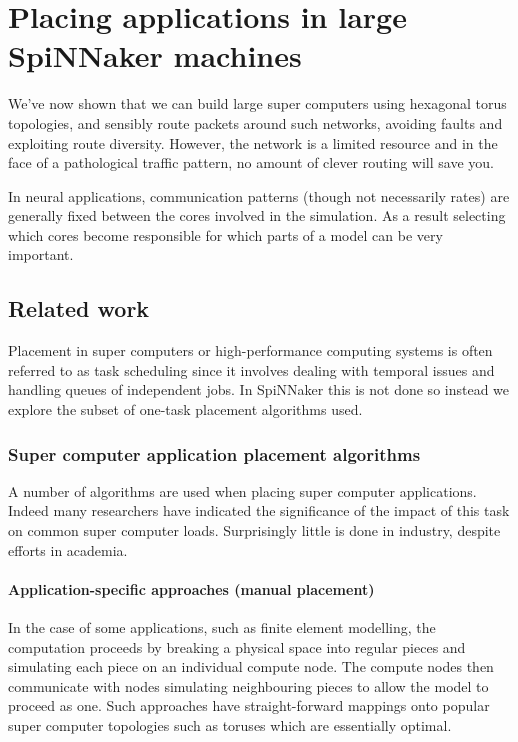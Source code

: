 \chapter{Placing applications in large SpiNNaker machines}

We've now shown that we can build large super computers using hexagonal torus
topologies, and sensibly route packets around such networks, avoiding faults
and exploiting route diversity. However, the network is a limited resource and
in the face of a pathological traffic pattern, no amount of clever routing will
save you.

In neural applications, communication patterns (though not necessarily rates)
are generally fixed between the cores involved in the simulation. As a result
selecting which cores become responsible for which parts of a model can be very
important.

	\section{Related work}
		
		Placement in super computers or high-performance computing systems is often
		referred to as task scheduling since it involves dealing with temporal
		issues and handling queues of independent jobs. In SpiNNaker this is not
		done so instead we explore the subset of one-task placement algorithms
		used.
		
		\subsection{Super computer application placement algorithms}
			
			A number of algorithms are used when placing super computer applications.
			Indeed many researchers have indicated the significance of the impact of
			this task on common super computer loads. Surprisingly little is done in
			industry, despite efforts in academia.
			
			\subsubsection{Application-specific approaches (manual placement)}
				
				
				In the case of some applications, such as finite element modelling, the
				computation proceeds by breaking a physical space into regular pieces
				and simulating each piece on an individual compute node. The compute
				nodes then communicate with nodes simulating neighbouring pieces to
				allow the model to proceed as one. Such approaches have
				straight-forward mappings onto popular super computer topologies such
				as toruses which are essentially optimal.
				
